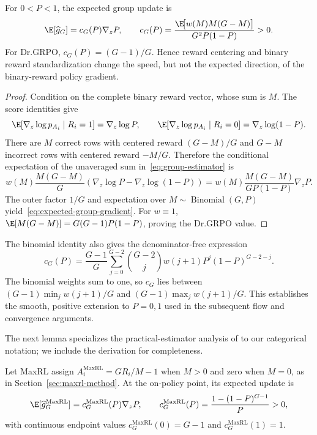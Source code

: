 \begin{lemma}
\label{lem:grpo-mean}
For $0<P<1$, the expected group update is
\begin{equation}
  \E[\widehat g_G]
  =c_G(P)\nabla_z P,
  \qquad
  c_G(P)=
  \frac{\E\!\big[w(M)M(G-M)\big]}{G^2P(1-P)}>0.
  \label{eq:expected-group-gradient}
\end{equation}
For Dr.GRPO, $c_G(P)=(G-1)/G$. Hence reward centering and binary reward
standardization change the speed, but not the expected direction, of the
binary-reward policy gradient.
\end{lemma}

\begin{proof}
Condition on the complete binary reward vector, whose sum is $M$. The score
identities give
\[
  \E[\nabla_z\log p_{A_i}\mid R_i=1]=\nabla_z\log P,
  \qquad
  \E[\nabla_z\log p_{A_i}\mid R_i=0]
  =\nabla_z\log(1-P).
\]
There are $M$ correct rows with centered reward $(G-M)/G$ and $G-M$
incorrect rows with centered reward $-M/G$. Therefore the conditional
expectation of the unaveraged sum in~\eqref{eq:group-estimator} is
\[
  w(M)\frac{M(G-M)}{G}
  \left(\nabla_z\log P-\nabla_z\log(1-P)\right)
  =w(M)\frac{M(G-M)}{GP(1-P)}\nabla_zP.
\]
The outer factor $1/G$ and expectation over
$M\sim\operatorname{Binomial}(G,P)$ yield~\eqref{eq:expected-group-gradient}.
For $w\equiv1$,
$\E[M(G-M)]=G(G-1)P(1-P)$, proving the Dr.GRPO value.
\end{proof}

The binomial identity also gives the denominator-free expression
\[
 c_G(P)=\frac{G-1}{G}\sum_{j=0}^{G-2}\binom{G-2}{j}
 w(j+1)P^j(1-P)^{G-2-j}.
\]
The binomial weights sum to one, so $c_G$ lies between
$(G-1)\min_j w(j+1)/G$ and $(G-1)\max_j w(j+1)/G$.
This establishes the smooth, positive extension to $P=0,1$ used in the
subsequent flow and convergence arguments.

The next lemma specializes the practical-estimator analysis of
\citet[Section~4.3 and Appendix~D, Theorem~5]{tajwar2026maxrl}
to our categorical notation; we include the derivation for completeness.

\begin{lemma}
\label{lem:maxrl-mean}
Let MaxRL assign
$A_i^{\mathrm{MaxRL}}=GR_i/M-1$ when $M>0$ and zero when $M=0$, as in
Section~\ref{sec:maxrl-method}. At the on-policy point, its expected update is
\begin{equation}
  \E[\widehat g_G^{\mathrm{MaxRL}}]
  =c_G^{\mathrm{MaxRL}}(P)\nabla_zP,
  \qquad
  c_G^{\mathrm{MaxRL}}(P)
  =\frac{1-(1-P)^{G-1}}{P}>0,
  \label{eq:maxrl-expected-gradient}
\end{equation}
with continuous endpoint values
$c_G^{\mathrm{MaxRL}}(0)=G-1$ and
$c_G^{\mathrm{MaxRL}}(1)=1$.
\end{lemma}

